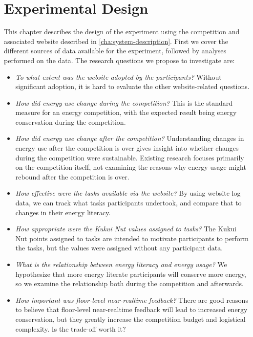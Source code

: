 \chapter{Experimental Design}
\label{cha:experimental-design}


This chapter describes the design of the experiment using the competition and associated website described in \autoref{cha:system-description}. First we cover the different sources of data available for the experiment, followed by analyses performed on the data. The research questions we propose to investigate are:

\begin{itemize}
	\item \emph{To what extent was the website adopted by the participants?} Without significant adoption, it is hard to evaluate the other website-related questions.
	\item \emph{How did energy use change during the competition?} This is the standard measure for an energy competition, with the expected result being energy conservation during the competition.
	\item \emph{How did energy use change after the competition?} Understanding changes in energy use after the competition is over gives insight into whether changes during the competition were sustainable. Existing research focuses primarily on the competition itself, not examining the reasons why energy usage might rebound after the competition is over.
	\item \emph{How effective were the tasks available via the website?} By using website log data, we can track what tasks participants undertook, and compare that to changes in their energy literacy.
	\item \emph{How appropriate were the Kukui Nut values assigned to tasks?} The Kukui Nut points assigned to tasks are intended to motivate participants to perform the tasks, but the values were assigned without any participant data.
	\item \emph{What is the relationship between energy literacy and energy usage?} We hypothesize that more energy literate participants will conserve more energy, so we examine the relationship both during the competition and afterwards.
	\item \emph{How important was floor-level near-realtime feedback?} There are good reasons to believe that floor-level near-realtime feedback will lead to increased energy conservation, but they greatly increase the competition budget and logistical complexity. Is the trade-off worth it?
\end{itemize}

